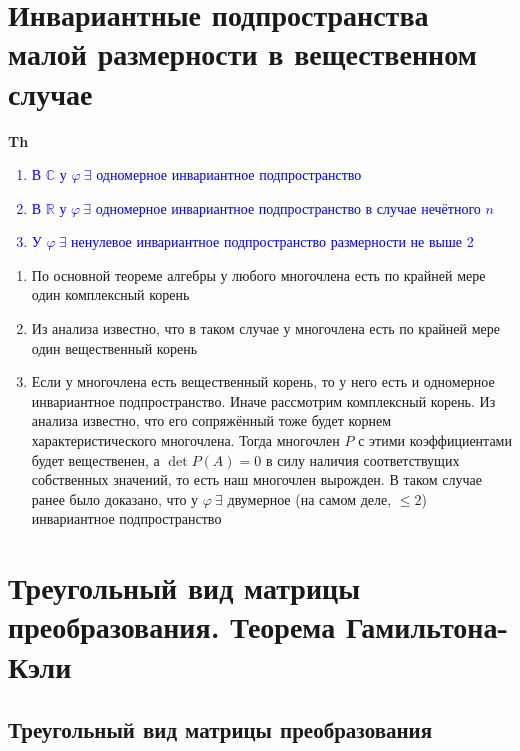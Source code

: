 \documentclass[a4paper, 14pt]{article}
\begin{document}
    

    \section{Инвариантные подпространства малой размерности в вещественном случае}

    \textbf{Th} \textcolor{blue}{
        \begin{enumerate}
            \item В $\mathbb{C}$ у $\varphi~\exists$ одномерное инвариантное подпространство
            \item В $\mathbb{R}$ у $\varphi~\exists$ одномерное инвариантное подпространство в случае нечётного $n$
            \item У $\varphi~\exists$ ненулевое инвариантное подпространство размерности не выше 2
        \end{enumerate}             }

    \begin{enumerate}
        \item По основной теореме алгебры у любого многочлена есть по крайней мере один комплексный корень
        \item Из анализа известно, что в таком случае у многочлена есть по крайней мере один вещественный корень
        \item Если у многочлена есть вещественный корень, то у него есть и одномерное инвариантное подпространство.
        Иначе рассмотрим комплексный корень.
        Из анализа известно, что его сопряжённый тоже будет корнем характеристического многочлена.
        Тогда многочлен $P$ с этими коэффициентами будет вещественен, а $\det P(A) = 0$ в силу наличия соответствущих
        собственных значений, то есть наш многочлен вырожден.
        В таком случае ранее было доказано, что у $\varphi~\exists$ двумерное (на самом деле, $\leq 2$) инвариантное
        подпространство
    \end{enumerate}

    \section{Треугольный вид матрицы преобразования.
    Теорема Гамильтона-Кэли}

    \subsection{Треугольный вид матрицы преобразования}
\end{document}
